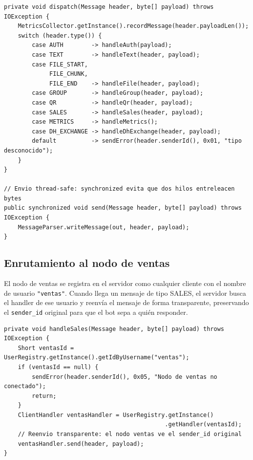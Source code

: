 \documentclass[12pt,a4paper]{article}
\begin{document}
\begin{lstlisting}[style=java, caption={ClientHandler.java --- dispatch según tipo de mensaje}]
private void dispatch(Message header, byte[] payload) throws IOException {
    MetricsCollector.getInstance().recordMessage(header.payloadLen());
    switch (header.type()) {
        case AUTH        -> handleAuth(payload);
        case TEXT        -> handleText(header, payload);
        case FILE_START,
             FILE_CHUNK,
             FILE_END    -> handleFile(header, payload);
        case GROUP       -> handleGroup(header, payload);
        case QR          -> handleQr(header, payload);
        case SALES       -> handleSales(header, payload);
        case METRICS     -> handleMetrics();
        case DH_EXCHANGE -> handleDhExchange(header, payload);
        default          -> sendError(header.senderId(), 0x01, "tipo desconocido");
    }
}

// Envio thread-safe: synchronized evita que dos hilos entreleacen bytes
public synchronized void send(Message header, byte[] payload) throws IOException {
    MessageParser.writeMessage(out, header, payload);
}
\end{lstlisting}

\subsection{Enrutamiento al nodo de ventas}

El nodo de ventas se registra en el servidor como cualquier cliente con el
nombre de usuario \texttt{"ventas"}. Cuando llega un mensaje de tipo SALES,
el servidor busca el handler de ese usuario y reenvía el mensaje de forma
transparente, preservando el \texttt{sender\_id} original para que el bot
sepa a quién responder.

\begin{lstlisting}[style=java, caption={ClientHandler.java --- handleSales()}]
private void handleSales(Message header, byte[] payload) throws IOException {
    Short ventasId = UserRegistry.getInstance().getIdByUsername("ventas");
    if (ventasId == null) {
        sendError(header.senderId(), 0x05, "Nodo de ventas no conectado");
        return;
    }
    ClientHandler ventasHandler = UserRegistry.getInstance()
                                              .getHandler(ventasId);
    // Reenvio transparente: el nodo ventas ve el sender_id original
    ventasHandler.send(header, payload);
}
\end{lstlisting}

\end{document}
